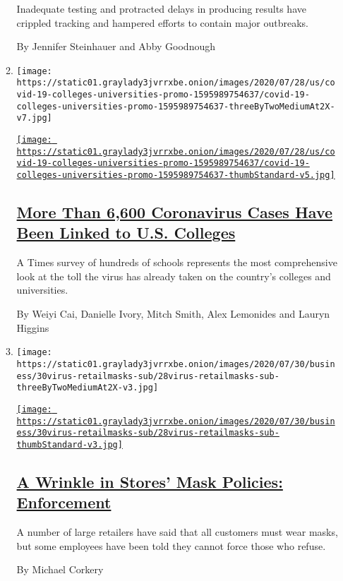 \begin{enumerate}
\begin{enumerate}
    Inadequate testing and protracted delays in producing results have
    crippled tracking and hampered efforts to contain major outbreaks.

    By Jennifer Steinhauer and Abby Goodnough
  \item
    \texttt{[image: https://static01.graylady3jvrrxbe.onion/images/2020/07/28/us/covid-19-colleges-universities-promo-1595989754637/covid-19-colleges-universities-promo-1595989754637-threeByTwoMediumAt2X-v7.jpg]}

    \href{/interactive/2020/07/28/us/covid-19-colleges-universities.html}{\texttt{[image: https://static01.graylady3jvrrxbe.onion/images/2020/07/28/us/covid-19-colleges-universities-promo-1595989754637/covid-19-colleges-universities-promo-1595989754637-thumbStandard-v5.jpg]}}

    \hypertarget{more-than-6600-coronavirus-cases-have-been-linked-to-us-colleges}{%
    \subsection{\texorpdfstring{\href{/interactive/2020/07/28/us/covid-19-colleges-universities.html}{More
    Than 6,600 Coronavirus Cases Have Been Linked to U.S.
    Colleges}}{More Than 6,600 Coronavirus Cases Have Been Linked to U.S. Colleges}}\label{more-than-6600-coronavirus-cases-have-been-linked-to-us-colleges}}

    A Times survey of hundreds of schools represents the most
    comprehensive look at the toll the virus has already taken on the
    country's colleges and universities.

    By Weiyi Cai, Danielle Ivory, Mitch Smith, Alex Lemonides and Lauryn
    Higgins
  \item
    \texttt{[image: https://static01.graylady3jvrrxbe.onion/images/2020/07/30/business/30virus-retailmasks-sub/28virus-retailmasks-sub-threeByTwoMediumAt2X-v3.jpg]}

    \href{/2020/07/29/business/coronavirus-masks-stores-walmart.html}{\texttt{[image: https://static01.graylady3jvrrxbe.onion/images/2020/07/30/business/30virus-retailmasks-sub/28virus-retailmasks-sub-thumbStandard-v3.jpg]}}

    \hypertarget{a-wrinkle-in-stores-mask-policies-enforcement}{%
    \subsection{\texorpdfstring{\href{/2020/07/29/business/coronavirus-masks-stores-walmart.html}{A
    Wrinkle in Stores' Mask Policies:
    Enforcement}}{A Wrinkle in Stores' Mask Policies: Enforcement}}\label{a-wrinkle-in-stores-mask-policies-enforcement}}

    A number of large retailers have said that all customers must wear
    masks, but some employees have been told they cannot force those who
    refuse.

    By Michael Corkery
  \end{enumerate}
\end{enumerate}

